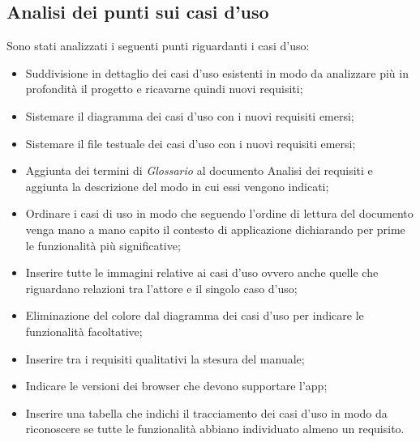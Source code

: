 \subsection{Analisi dei punti sui casi d'uso}
Sono stati analizzati i seguenti punti riguardanti i casi d'uso:
\begin{itemize}
    \item Suddivisione in dettaglio dei casi d'uso esistenti in modo da analizzare più in profondità il progetto e ricavarne quindi nuovi requisiti;
    \item Sistemare il diagramma dei casi d'uso con i nuovi requisiti emersi;
    \item Sistemare il file testuale dei casi d'uso con i nuovi requisiti emersi;
    \item Aggiunta dei termini di \textit{Glossario} al documento Analisi dei requisiti e aggiunta la descrizione del modo in cui essi vengono indicati;
    \item Ordinare i casi di uso in modo che seguendo l'ordine di lettura del documento venga mano a mano capito il contesto di applicazione dichiarando per prime le funzionalità più significative;
    \item Inserire tutte le immagini relative ai casi d'uso ovvero anche quelle che riguardano relazioni tra l'attore e il singolo caso d'uso;
    \item Eliminazione del colore dal diagramma dei casi d'uso per indicare le funzionalità facoltative;
    \item Inserire tra i requisiti qualitativi la stesura del manuale;
    \item Indicare le versioni dei browser che devono supportare l'app;
    \item Inserire una tabella che indichi il tracciamento dei casi d'uso in modo da riconoscere se tutte le funzionalità abbiano individuato almeno un requisito.
\end{itemize}
